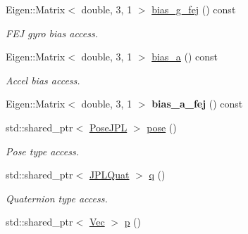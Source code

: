 \begin{DoxyCompactItemize}
\mbox{\label{classov__type_1_1IMU_a4d547e3f63e1bd054b486709d64b0ffd}} 
Eigen\+::\+Matrix$<$ double, 3, 1 $>$ \hyperlink{classov__type_1_1IMU_a4d547e3f63e1bd054b486709d64b0ffd}{bias\+\_\+g\+\_\+fej} () const
\begin{DoxyCompactList}\small\item\em F\+EJ gyro bias access. \end{DoxyCompactList}\item 
\mbox{\label{classov__type_1_1IMU_a672ba68b2506a3d225bb6da4e5b4d93f}} 
Eigen\+::\+Matrix$<$ double, 3, 1 $>$ \hyperlink{classov__type_1_1IMU_a672ba68b2506a3d225bb6da4e5b4d93f}{bias\+\_\+a} () const
\begin{DoxyCompactList}\small\item\em Accel bias access. \end{DoxyCompactList}\item 
\mbox{\label{classov__type_1_1IMU_adda8baa965ceb0e6e4f0d7e47cf9875d}} 
Eigen\+::\+Matrix$<$ double, 3, 1 $>$ {\bfseries bias\+\_\+a\+\_\+fej} () const
\item 
\mbox{\label{classov__type_1_1IMU_aa083ef7c5392ee0da48ba77c5093bee2}} 
std\+::shared\+\_\+ptr$<$ \hyperlink{classov__type_1_1PoseJPL}{Pose\+J\+PL} $>$ \hyperlink{classov__type_1_1IMU_aa083ef7c5392ee0da48ba77c5093bee2}{pose} ()
\begin{DoxyCompactList}\small\item\em Pose type access. \end{DoxyCompactList}\item 
\mbox{\label{classov__type_1_1IMU_ac1f6387823cd403da8abbb84ce4368fb}} 
std\+::shared\+\_\+ptr$<$ \hyperlink{classov__type_1_1JPLQuat}{J\+P\+L\+Quat} $>$ \hyperlink{classov__type_1_1IMU_ac1f6387823cd403da8abbb84ce4368fb}{q} ()
\begin{DoxyCompactList}\small\item\em Quaternion type access. \end{DoxyCompactList}\item 
\mbox{\label{classov__type_1_1IMU_a6f70d8ea8f21a8e47be71cd77443d153}} 
std\+::shared\+\_\+ptr$<$ \hyperlink{classov__type_1_1Vec}{Vec} $>$ \hyperlink{classov__type_1_1IMU_a6f70d8ea8f21a8e47be71cd77443d153}{p} ()

\end{DoxyCompactItemize}
